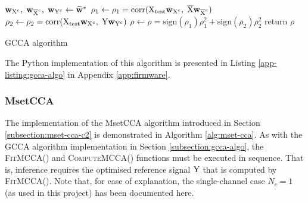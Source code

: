 \begin{algorithm}
\begin{algorithmic}[1]
\vspace{0.3cm}
 
\State ${\mathbf{w}}_{{\textrm{X}}^{c}}, \; {\mathbf{w}}_{\overline{{\textrm{X}}}^{c}}, \; {\mathbf{w}}_{{\textrm{Y}}^{c}} \gets \widetilde{{\mathbf{w}}}^*$ 
\State $\rho_1 \gets \rho_1 = \textrm{corr}({\textrm{X}}_{\textrm{test}}{\mathbf{w}}_{{\textrm{X}}^{c}}, \; \overline{{\textrm{X}}}{\mathbf{w}}_{\overline{{\textrm{X}}}^{c}})$ 
\State $\rho_2 \gets \rho_2 = \textrm{corr}({\textrm{X}}_{\textrm{test}}{\mathbf{w}}_{{\textrm{X}}^{c}}, \; {\textrm{Y}}{\mathbf{w}}_{{\textrm{Y}}^{c}})$ 
\State $\rho \gets \rho = \textrm{sign}(\rho_1)\rho_1^2 + \textrm{sign}(\rho_2)\rho_2^2$ 
\State return $\rho$
\EndFunction
\end{algorithmic}
\caption{GCCA algorithm}
\label{alg:gcca}
\end{algorithm}
The Python implementation of this algorithm is presented in Listing \ref{app-listing:gcca-algo} in Appendix \ref{app:firmware}.

\subsubsection{MsetCCA}
The implementation of the MsetCCA algorithm introduced in Section \ref{subsection:mset-cca-c2} is demonstrated in Algorithm \ref{alg:mset-cca}. As with the GCCA algorithm implementation in Section \ref{subsection:gcca-algo}, the \textsc{FitMCCA()} and \textsc{ComputeMCCA()} functions must be executed in sequence. That is, inference requires the optimised reference signal ${\textrm{Y}}$ that is computed by \textsc{FitMCCA()}. Note that, for ease of explanation, the single-channel case $N_c=1$ (as used in this project) has been documented here. 

